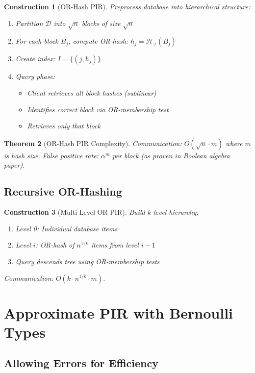 \documentclass[11pt,final,hidelinks]{article}
\newcommand{\DB}{\mathcal{D}}
\newcommand{\OR}{\lor}
\newcommand{\HashOR}[1]{\mathcal{H}_{\OR}(#1)}
\newtheorem{theorem}{Theorem}[section]
\newtheorem{construction}[theorem]{Construction}
\begin{document}
\begin{construction}[OR-Hash PIR]
Preprocess database into hierarchical structure:
\begin{enumerate}
    \item Partition $\DB$ into $\sqrt{n}$ blocks of size $\sqrt{n}$
    \item For each block $B_j$, compute OR-hash: $h_j = \HashOR{B_j}$
    \item Create index: $I = \{(j, h_j)\}$
    \item Query phase:
    \begin{itemize}
        \item Client retrieves all block hashes (sublinear)
        \item Identifies correct block via OR-membership test
        \item Retrieves only that block
    \end{itemize}
\end{enumerate}
\end{construction}

\begin{theorem}[OR-Hash PIR Complexity]
Communication: $O(\sqrt{n} \cdot m)$ where $m$ is hash size.
False positive rate: $\alpha^m$ per block (as proven in Boolean algebra paper).
\end{theorem}

\subsection{Recursive OR-Hashing}

\begin{construction}[Multi-Level OR-PIR]
Build $k$-level hierarchy:
\begin{enumerate}
    \item Level 0: Individual database items
    \item Level $i$: OR-hash of $n^{1/k}$ items from level $i-1$
    \item Query descends tree using OR-membership tests
\end{enumerate}
Communication: $O(k \cdot n^{1/k} \cdot m)$.
\end{construction}

\section{Approximate PIR with Bernoulli Types}

\subsection{Allowing Errors for Efficiency}
\end{document}
